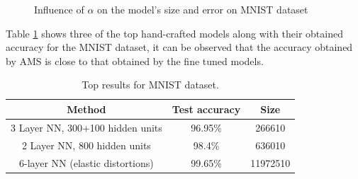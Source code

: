 \documentclass[preprint,12pt]{elsarticle}%
\begin{document}
\begin{figure}[H]
\centering
{}
\caption{Influence of $\alpha$ on the model's size and error on MNIST dataset}
\label{fig:alpha_mnist}
\end{figure}

Table \ref{table:MNIST_results_top} shows three of the top hand-crafted models along with their obtained accuracy for the MNIST dataset, it can be observed that the accuracy obtained by AMS is close to that obtained by the fine tuned models. 

\begin{table}[H]
\begin{center}
\begin{tabular}{| c | c | c |}
\hline
Method & Test accuracy & Size\\
\hline
3 Layer NN, 300+100 hidden units \cite{Lecun1989} &  96.95\% & 266610\\
2 Layer NN, 800 hidden units \cite{Simard2003} & 98.4\% & 636010\\
6-layer NN (elastic distortions) \cite{Ciresan2010}  & 99.65\% & 11972510\\
\hline
\end{tabular}
\end{center}
\caption{Top results for MNIST dataset.}
\label{table:MNIST_results_top}
\end{table}
\end{document}
